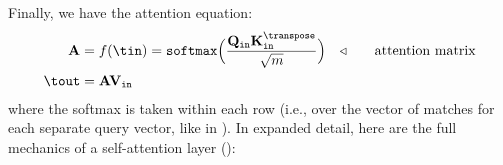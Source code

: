 Finally, we have the attention equation:
\begin{align}
    \mathbf{A} & = f(\tin) = \texttt{softmax}\Big(\frac{\mathbf{Q}_{\texttt{in}}\mathbf{K}_{\texttt{in}}^\transpose}{\sqrt{m}}\Big) & \triangleleft \quad\quad \text{attention matrix} \\
    \tout      & = \mathbf{A}\mathbf{V}_{\texttt{in}}
\end{align}
where the softmax is taken within each row (i.e., over the vector of matches for each separate query vector, like in \eqn{\ref{eqn:transformers:attention_question_keys}}). In expanded detail, here are the full mechanics of a self-attention layer (\fig{\ref{fig:transformers:attn_arch}}):
